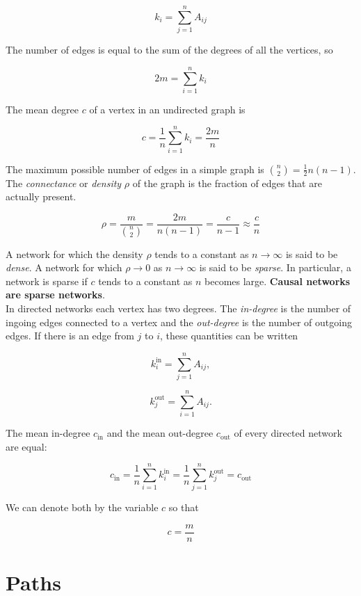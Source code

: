 \documentclass[12pt]{book}
\begin{document}
\begin{equation}
k_i = \sum\limits_{j=1}^n A_{ij}
\end{equation}

The number of edges is equal to the sum of the degrees of all the vertices, so

\begin{equation}
2m = \sum\limits_{i=1}^n k_i
\end{equation}

The mean degree $c$ of a vertex in an undirected graph is

\begin{equation}
c = \frac{1}{n} \sum\limits_{i=1}^n k_i = \frac{2m}{n}
\end{equation}

The maximum possible number of edges in a simple graph is $\binom{n}{2} = \frac{1}{2}n(n-1)$.  The \textit{connectance} or \textit{density} $\rho$ of the graph is the fraction of edges that are actually present.

\begin{equation}
\rho = \frac{m}{\binom{n}{2}} = \frac{2m}{n(n-1)} = \frac{c}{n-1} \approx \frac{c}{n}
\end{equation}

A network for which the density $\rho$ tends to a constant as $n \rightarrow \infty$ is said to be \textit{dense}.  A network for which $\rho \rightarrow 0$ as $n \rightarrow \infty$ is said to be \textit{sparse}.  In particular, a network is sparse if $c$ tends to a constant as $n$ becomes large.  \textbf{Causal networks are sparse networks}. \\

In directed networks each vertex has two degrees.  The \textit{in-degree} is the number of ingoing edges connected to a vertex and the \textit{out-degree} is the number of outgoing edges.  If there is an edge from $j$ to $i$, these quantities can be written

\begin{equation}
k_i^{\textrm{in}} = \sum\limits_{j=1}^n A_{ij},
\end{equation}

\begin{equation}
k_j^{\textrm{out}} = \sum\limits_{i=1}^n A_{ij}.
\end{equation}

The mean in-degree $c_{\textrm{in}}$ and the mean out-degree $c_{\textrm{out}}$ of every directed network are equal:

\begin{equation}
c_{\textrm{in}} = \frac{1}{n} \sum\limits_{i=1}^n k_i^{\textrm{in}} = \frac{1}{n} \sum\limits_{j=1}^n k_j^{\textrm{out}} = c_{\textrm{out}}
\end{equation}

We can denote both by the variable $c$ so that

\begin{equation}
c=\frac{m}{n}
\end{equation}

\section{Paths}
\end{document}
